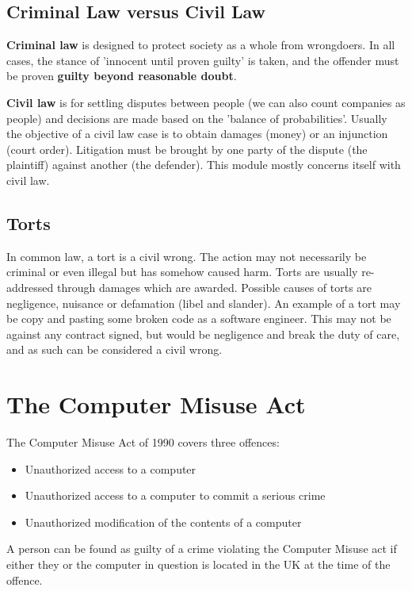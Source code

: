 \documentclass{article}
\begin{document}
	\subsection{Criminal Law versus Civil Law}
	\textbf{Criminal law} is designed to protect society as a whole from wrongdoers. In all cases, the stance of 'innocent until proven guilty' is taken, and the offender must be proven \textbf{guilty beyond reasonable doubt}.	
	\par 
	\textbf{Civil law} is for settling disputes between people (we can also count companies as people) and decisions are made based on the 'balance of probabilities'. Usually the objective of a civil law case is to obtain damages (money) or an injunction (court order). Litigation must be brought by one party of the dispute (the plaintiff) against another (the defender). This module mostly concerns itself with civil law.
	
	\subsection{Torts}
	In common law, a tort is a civil wrong. The action may not necessarily be criminal or even illegal but has somehow caused harm. Torts are usually re-addressed through damages which are awarded. Possible causes of torts are negligence, nuisance or defamation (libel and slander). An example of a tort may be copy and pasting some broken code as a software engineer. This may not be against any contract signed, but would be negligence and break the duty of care, and as such can be considered a civil wrong.
	
	\section{The Computer Misuse Act}
	The Computer Misuse Act of 1990 covers three offences:
	\begin{itemize}
		\item Unauthorized access to a computer
		\item Unauthorized access to a computer to commit a serious crime
		\item Unauthorized modification of the contents of a computer
	\end{itemize}
	
	A person can be found as guilty of a crime violating the Computer Misuse act if either they or the computer in question is located in the UK at the time of the offence.
	
\end{document}
